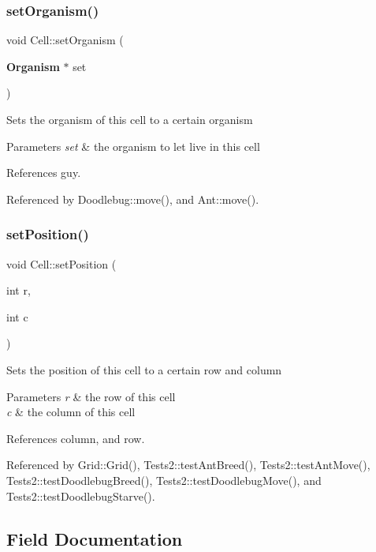 \subsubsection{set\+Organism()}
{\footnotesize\ttfamily void Cell\+::set\+Organism (\begin{DoxyParamCaption}\item[{\textbf{ Organism} $\ast$}]{set }\end{DoxyParamCaption})}

Sets the organism of this cell to a certain organism 
\begin{DoxyParams}{Parameters}
{\em set} & the organism to let live in this cell \\
\hline
\end{DoxyParams}


References guy.



Referenced by Doodlebug\+::move(), and Ant\+::move().

\mbox{\label{classCell_adb03c2c5ee34982692b2375777a5d1cd}} 
\subsubsection{set\+Position()}
{\footnotesize\ttfamily void Cell\+::set\+Position (\begin{DoxyParamCaption}\item[{int}]{r,  }\item[{int}]{c }\end{DoxyParamCaption})}

Sets the position of this cell to a certain row and column 
\begin{DoxyParams}{Parameters}
{\em r} & the row of this cell \\
\hline
{\em c} & the column of this cell \\
\hline
\end{DoxyParams}


References column, and row.



Referenced by Grid\+::\+Grid(), Tests2\+::test\+Ant\+Breed(), Tests2\+::test\+Ant\+Move(), Tests2\+::test\+Doodlebug\+Breed(), Tests2\+::test\+Doodlebug\+Move(), and Tests2\+::test\+Doodlebug\+Starve().



\subsection{Field Documentation}
\mbox{\label{classCell_a6aae9428106f7cd7574660e3c2278ee0}} 
